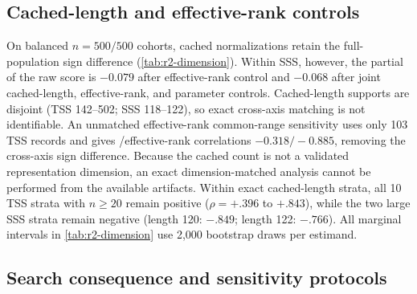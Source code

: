 \subsection{Cached-length and effective-rank controls}
\label{app:r2-dimension}

On balanced $n=500/500$ cohorts, cached normalizations retain the
full-population  sign difference (\cref{tab:r2-dimension}). Within
SSS, however, the partial of the raw score is $-0.079$ after effective-rank
control and $-0.068$ after joint cached-length, effective-rank, and parameter
controls. Cached-length supports are disjoint (TSS 142--502; SSS 118--122), so
exact cross-axis matching is not identifiable. An unmatched effective-rank
common-range sensitivity uses only 103 TSS records and gives
/effective-rank correlations $-0.318/-0.885$, removing the
cross-axis sign difference. Because the cached count is not a validated
representation dimension, an exact dimension-matched analysis cannot be
performed from the available artifacts. Within exact cached-length strata, all
10 TSS strata with $n\ge20$ remain positive ($\rho=+.396$ to $+.843$), while the
two large SSS strata remain negative (length 120: $-.849$; length 122: $-.766$).
All marginal intervals in \cref{tab:r2-dimension} use 2,000 bootstrap draws per
estimand.

\begin{table}[t]
\centering\small\setlength{\tabcolsep}{6pt}
\caption{\textbf{Dimension-linked sensitivities.} The final row is an unmatched
common-range sensitivity, not a causal or exact dimension match.}
\label{tab:r2-dimension}
\end{table}

\subsection{Search consequence and sensitivity protocols}
\label{app:r2-search}

